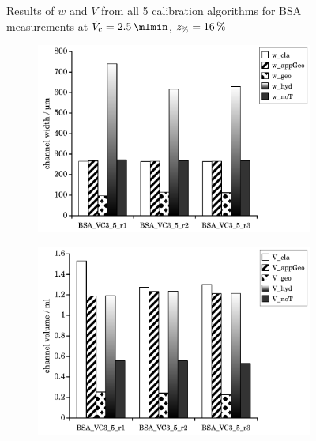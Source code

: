 \begin{figure}[htp]
\begin{center}
\begin{subfigure}{\subFigSize}
    \end{subfigure}
  \end{center}
  \vspace*{-4ex}    
  \caption[Results of $w$ and $V$ from all 5 calibration algorithms for BSA measurements at
  $\Vc = \SI{2.5}{\mlmin}$, $\zP = \SI{16}{\percent}$]{
    Results of $w$ and $V$ from all 5 calibration algorithms for BSA measurements at
    $\Vc = \SI{2.5}{\mlmin}$, $\zP = \SI{16}{\percent}$
  }
  \label{fig:calibRes_BSA_VC2_5_p16}
\end{figure}  
\begin{figure}[htp]
  \begin{center}
    \begin{subfigure}{\subFigSize}
      \includegraphics[width=\linewidth]{./images/data/eval_own_p16/calibW_BSA_VC_3_5_p16.pdf}
      \label{subfig:calibRes_BSA_VC3_5_w}
    \end{subfigure}
    \begin{subfigure}{\subFigSize}
      \includegraphics[width=\linewidth]{./images/data/eval_own_p16/calibV_BSA_VC_3_5_p16.pdf}

\end{subfigure}
\end{center}
\end{figure}
